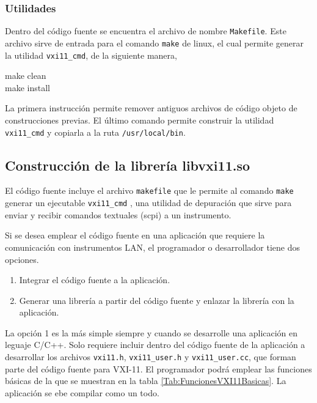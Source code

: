 \documentclass[paper=letter,oneside,fontsize=11pt, parskip=full]{scrartcl}
\newenvironment{code}
	{\begin{adjustwidth}{1.0cm}{0.0cm}\ttfamily}
	{\end{adjustwidth}}
\begin{document}
	\subsubsection{Utilidades}
	
	Dentro del código fuente se encuentra el archivo de nombre \texttt{Makefile}. Este archivo sirve de entrada para el comando \texttt{make} de linux, el cual permite generar la utilidad \texttt{vxi11\_cmd}, de la siguiente manera,
	
	\begin{code}
		make clean \\
		make install		
	\end{code}
	
	La primera instrucción permite remover antiguos archivos de código objeto de construcciones previas. El último comando permite construir la utilidad \texttt{vxi11\_cmd} y copiarla a la ruta \texttt{/usr/local/bin}.	
	
	\subsection{Construcción de la librería libvxi11.so}	
	
	El código fuente incluye el archivo \texttt{makefile} que le permite al comando \texttt{make} generar un ejecutable  \texttt{vxi11\_cmd} , una utilidad de depuración que sirve para enviar y recibir comandos textuales (scpi) a un instrumento.

	Si se desea emplear el código fuente en una aplicación que requiere la comunicación con instrumentos LAN, el programador o 
	desarrollador tiene dos opciones.
	
	\begin{enumerate}
		\item Integrar el código fuente a la aplicación. 
		\item Generar una librería a partir del código fuente y enlazar la librería con la aplicación.
	\end{enumerate}	

	La opción 1 es la más simple siempre y cuando se desarrolle una aplicación en leguaje C/C++. Solo requiere incluir dentro del código fuente de la aplicación a desarrollar los archivos \texttt{vxi11.h}, \texttt{vxi11\_user.h} y \texttt{vxi11\_user.cc}, que forman parte del código fuente para VXI-11. El programador podrá emplear las funciones básicas de la que se muestran en la tabla \ref{Tab:FuncionesVXI11Basicas}. La aplicación se ebe compilar como un todo.
	
\end{document}
